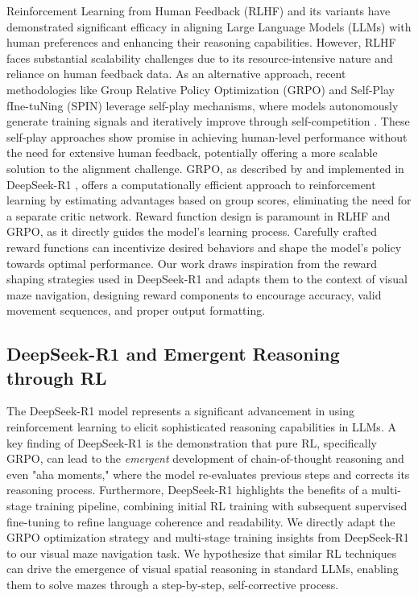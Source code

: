 Reinforcement Learning from Human Feedback (RLHF) and its variants have demonstrated significant efficacy in aligning Large Language Models (LLMs) with human preferences and enhancing their reasoning capabilities. However, RLHF faces substantial scalability challenges due to its resource-intensive nature and reliance on human feedback data. As an alternative approach, recent methodologies like Group Relative Policy Optimization (GRPO)\citep{kwon2023rewarddesignlanguagemodels} and Self-Play fIne-tuNing (SPIN) leverage self-play mechanisms, where models autonomously generate training signals and iteratively improve through self-competition \cite{chen2024selfplayfinetuningconvertsweak}. These self-play approaches show promise in achieving human-level performance without the need for extensive human feedback, potentially offering a more scalable solution to the alignment challenge. GRPO, as described by \citet{shao2024deepseekmathpushinglimitsmathematical} and implemented in DeepSeek-R1 \citep{Guo2025DeepSeekR1}, offers a computationally efficient approach to reinforcement learning by estimating advantages based on group scores, eliminating the need for a separate critic network.  Reward function design is paramount in RLHF and GRPO, as it directly guides the model's learning process.  Carefully crafted reward functions can incentivize desired behaviors and shape the model's policy towards optimal performance.  Our work draws inspiration from the reward shaping strategies used in DeepSeek-R1 and adapts them to the context of visual maze navigation, designing reward components to encourage accuracy, valid movement sequences, and proper output formatting.

\subsection{DeepSeek-R1 and Emergent Reasoning through RL}

The DeepSeek-R1 model \citep{Guo2025DeepSeekR1} represents a significant advancement in using reinforcement learning to elicit sophisticated reasoning capabilities in LLMs.  A key finding of DeepSeek-R1 is the demonstration that pure RL, specifically GRPO, can lead to the \textit{emergent} development of chain-of-thought reasoning and even "aha moments," where the model re-evaluates previous steps and corrects its reasoning process.  Furthermore, DeepSeek-R1 highlights the benefits of a multi-stage training pipeline, combining initial RL training with subsequent supervised fine-tuning to refine language coherence and readability.  We directly adapt the GRPO optimization strategy and multi-stage training insights from DeepSeek-R1 to our visual maze navigation task.  We hypothesize that similar RL techniques can drive the emergence of visual spatial reasoning in standard LLMs, enabling them to solve mazes through a step-by-step, self-corrective process.

